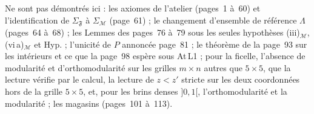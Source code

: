 Ne sont pas démontrés ici : les axiomes de l'atelier (pages~1 à~60) et l'identification de $\Sigma_{\mathfrak F}$ à $\Sigma_{\mathcal M}$ (page~61) ; le changement d'ensemble de référence $\Lambda$ (pages~64 à~68) ; les Lemmes des pages~76 à~79 sous les seules hypothèses (iii)$_{\mathcal M}$, (vi\,a)$_{\mathcal M}$ et Hyp. ; l'unicité de $P$ annoncée page~81 ; le théorème de la page~93 sur les intérieurs et ce que la page~98 espère sous At\,L1 ; pour la ficelle, l'absence de modularité et d'orthomodularité sur les grilles $m \times n$ autres que $5 \times 5$, que la lecture vérifie par le calcul, la lecture de $z < z'$ stricte sur les deux coordonnées hors de la grille $5 \times 5$, et, pour les brins denses $]0, 1[$, l'orthomodularité et la modularité ; les magasins (pages~101 à~113).

